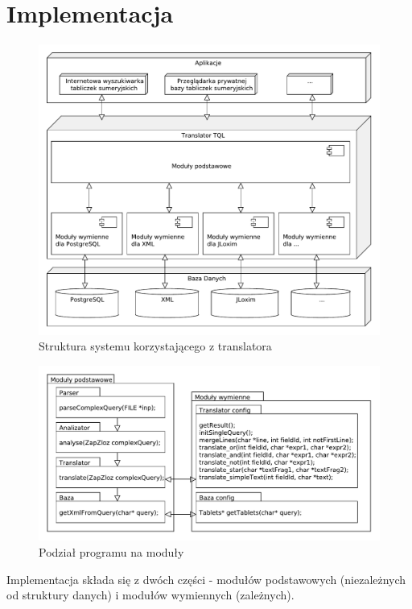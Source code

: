 \documentclass{pracamgr}
\begin{document}
\chapter{Implementacja}
\begin{figure}[h]
 \centering
 \includegraphics[width=500px,bb=0 0 608 517]{./diagramy/struktura.pdf}
 \caption{Struktura systemu korzystającego z translatora}
\end{figure}
\newpage 
\begin{figure}
 \centering
 \includegraphics[width=500px,bb=0 0 585 300]{./diagramy/pakiety.pdf}
 \caption{Podział programu na moduły}
\end{figure}

Implementacja składa się z dwóch części - modułów podstawowych (niezależnych od struktury danych) i modułów wymiennych (zależnych).
\end{document}
